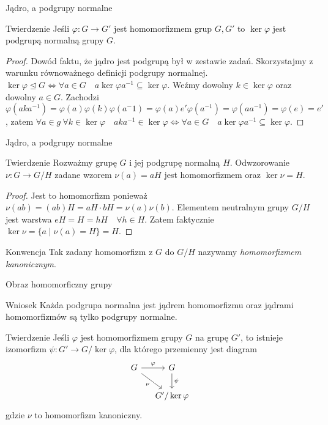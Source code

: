 \documentclass{beamer}
\let\phi\varphi
\begin{document}
\begin{frame}{Jądro, a podgrupy normalne}
    \begin{block}{Twierdzenie}
        Jeśli $\phi : G \rightarrow  G'$ jest homomorfizmem grup $G, G'$ to $\ker \phi$ jest podgrupą normalną grupy $G$.
    \end{block}
    \pause 
    \begin{proof}
        Dowód faktu, że jądro jest podgrupą był w zestawie zadań. Skorzystajmy z warunku równoważnego definicji podgrupy normalnej.
        $\ker \phi \trianglelefteq G \Leftrightarrow \forall a \in G \quad a \ker \phi a^{-1} \subseteq \ker \phi$. 
        Weźmy dowolny $k \in \ker \phi$ oraz dowolny $a \in G$. Zachodzi $\phi(aka^{-1}) = \phi(a) \phi(k) \phi(a^-1) = \phi(a) e' \phi(a^{-1}) = \phi(a a^{-1}) = \phi(e) = e'$, 
        zatem $\forall a \in g  \ \forall k \in \ker \phi \quad a k a^{-1} \in \ker \phi  \Leftrightarrow \forall a \in G \quad a \ker \phi a^{-1} \subseteq \ker \phi$.
    \end{proof}
\end{frame}

\begin{frame}{Jądro, a podgrupy normalne}
    \begin{block}{Twierdzenie}
        Rozważmy grupę $G$ i jej podgrupę normalną $H$. Odwzorowanie $\nu : G \rightarrow G/H$ zadane wzorem $\nu(a) = aH$
        jest homomorfizmem oraz $\ker \nu = H$.
    \end{block}
    \pause 
    \begin{proof}
        Jest to homomorfizm ponieważ $\nu(ab) = (ab)H = aH \cdot bH = \nu(a)\nu(b)$. Elementem neutralnym grupy $G/H$ jest warstwa $eH = H = hH  \quad \forall h \in H.$
        Zatem faktycznie $\ker \nu = \{ a \mid \nu(a) = H\} = H$. 
    \end{proof}    
    \pause 
    \begin{alertblock}{Konwencja}
        Tak zadany homomorfizm z $G$ do $G/H$ nazywamy \textit{homomorfizmem kanonicznym}.
    \end{alertblock}
\end{frame}

\begin{frame}{Obraz homomorficzny grupy}
    \begin{alertblock}{Wniosek}
        Każda podgrupa normalna jest jądrem homomorfizmu oraz jądrami homomorfizmów są tylko podgrupy normalne.
    \end{alertblock}
    \pause
    \begin{block}{Twierdzenie}
        Jeśli $\phi$ jest homomorfizmem grupy $G$ na grupę $G'$, to istnieje izomorfizm $\psi : G' \rightarrow G/\ker\phi$,
        dla którego przemienny jest diagram 
        $$
            \begin{tikzcd}[ampersand replacement=\&, column sep=small]
                G \arrow[r, "\phi"]  \arrow[rd, "\nu"'] \& G \arrow[d, "\psi"] \\
                \& G' / \ker \phi
            \end{tikzcd}
        $$   
        gdzie $\nu$ to homomorfizm kanoniczny.
    \end{block}
\end{frame}
\end{document}
